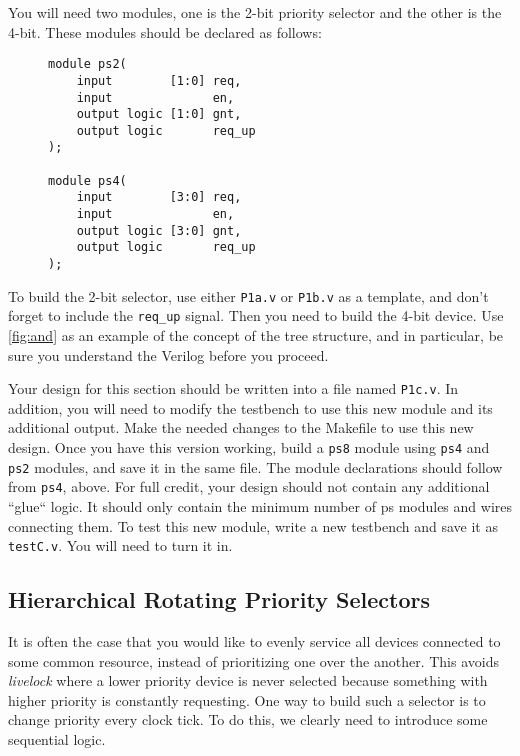 \documentclass{article}
\begin{document}
You will need two modules, one is the 2-bit priority selector and the other is
the 4-bit. These modules should be declared as follows:

\begin{figure}[H]
\begin{verbatim}
module ps2(
	input        [1:0] req,
	input              en,
	output logic [1:0] gnt,
	output logic       req_up
);

module ps4(
	input        [3:0] req,
	input              en,
	output logic [3:0] gnt,
	output logic       req_up
);
\end{verbatim}
\end{figure}

To build the 2-bit selector, use either \texttt{P1a.v} or
\texttt{P1b.v} as a template, and don't forget to include the \texttt{req\_up}
signal. Then you need to build the 4-bit device. Use \cref{fig:and} as an
example of the concept of the tree structure, and in particular, be sure you 
understand the Verilog before you proceed.

Your design for this section should be written into a file named \texttt{P1c.v}.
In addition, you will need to modify the testbench to use this new module and
its additional output. Make the needed changes to the Makefile to use this new
design. Once you have this version working, build a \texttt{ps8} module using
\texttt{ps4} and \texttt{ps2} modules, and save it in the same file. The module
declarations should follow from \texttt{ps4}, above. For full credit, your design
should not contain any additional ``glue`` logic. It should only contain the
minimum number of ps modules and wires connecting them. To test this new
module, write a new testbench and save it as \texttt{testC.v}. You will need to
turn it in.

\subsection{Hierarchical Rotating Priority Selectors}
It is often the case that you would like to evenly service all devices connected
to some common resource, instead of prioritizing one over the another. This
avoids \emph{livelock} where a lower priority device is never selected because
something with higher priority is constantly requesting. One way to build such a
selector is to change priority every clock tick. To do this, we clearly need to
introduce some sequential logic.
\end{document}
